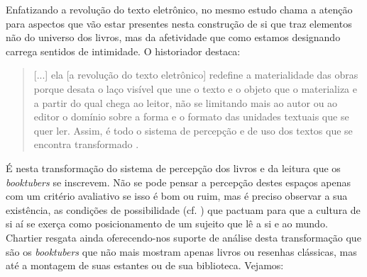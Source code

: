 Enfatizando a revolução do texto eletrônico, \citeauthor{chartier2019lersem} no mesmo estudo chama a atenção para aspectos que vão estar presentes nesta construção de si que traz elementos não do universo dos livros, mas da afetividade que como estamos designando carrega sentidos de intimidade. O
historiador destaca:

\begin{quote}
[...] ela [a revolução do texto eletrônico] redefine a
materialidade das obras porque desata o laço visível que une o texto e o
objeto que o materializa e a partir do qual chega ao leitor, não se
limitando mais ao autor ou ao editor o domínio sobre a forma e o formato
das unidades textuais que se quer ler. Assim, é todo o sistema de
percepção e de uso dos textos que se encontra transformado \cite[p. 13–14]{chartier2019lersem}.
\end{quote}

É nesta transformação do sistema de percepção dos livros e da leitura
que os \textit{booktubers} se inscrevem. Não se pode pensar a percepção
destes espaços apenas com um critério avaliativo se isso é bom ou ruim,
mas é preciso observar a sua existência, as condições de possibilidade
(cf. \textcite{foucault2009arqueologia}) que pactuam para que a cultura de si aí se exerça como posicionamento de um sujeito que lê a si e ao mundo. Chartier
resgata ainda \textcite{lajolo_literatura_2017} oferecendo-nos suporte de
análise desta transformação que são os \textit{booktubers} que não mais
mostram apenas livros ou resenhas clássicas, mas até a montagem de suas
estantes ou de sua biblioteca. Vejamos:

